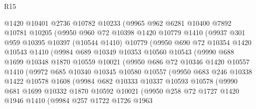 \begin{lexlean}{R15}
\begin{coremodule}
          @1420
          @10401
          @2736
          @10782
          @10233
          (@9965
            @962
            @6281
            @10400
            @7892
            @10781
            @10205
            (@9950
              @960
              @72
              @10398
              @1420
              @10779
              @1410
              (@9937
                @301
                @959
                @10395
                @10397
                (@10544 @1410)
                @10779
                (@9950
                  @690
                  @72
                  @10354
                  @1420
                  @10543
                  @1410
                  (@9984
                    @689
                    @10349
                    @10353
                    @10560
                    @10543
                    (@9990
                      @688
                      @1699
                      @10348
                      @1870
                      @10559
                      @10021
                      (@9950
                        @686
                        @72
                        @10346
                        @1420
                        @10557
                        @1410
                        (@9972
                          @685
                          @10340
                          @10345
                          @10580
                          @10557
                          (@9950
                            @683
                            @246
                            @10338
                            @1422
                            @10578
                            @1608
                            (@9984
                              @682
                              @10333
                              @10337
                              @10593
                              @10578
                              (@9990
                                @681
                                @1699
                                @10332
                                @1870
                                @10592
                                @10021
                                (@9950
                                  @258
                                  @72
                                  @1727
                                  @1420
                                  @1946
                                  @1410
                                  (@9984
                                    @257
                                    @1722
                                    @1726
                                    @1963

\end{coremodule}
\end{lexlean}
